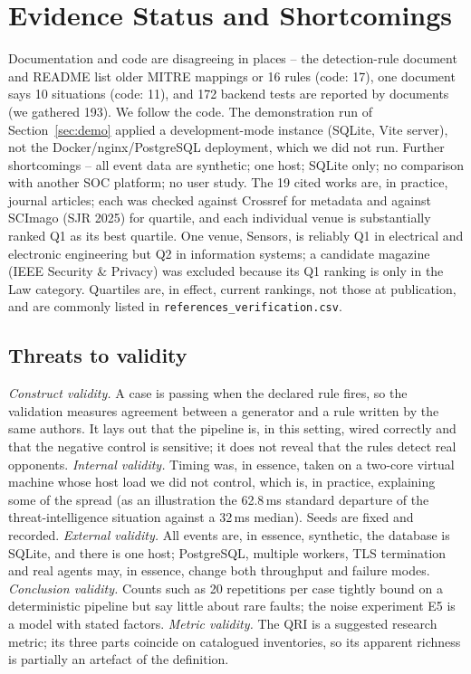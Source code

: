 \documentclass[conference]{IEEEtran}
\newcommand{\code}[1]{\texttt{#1}}
\begin{document}
\section{Evidence Status and Shortcomings}\label{sec:limits}
Documentation and code are disagreeing in places -- the detection-rule document and README list older MITRE mappings or 16 rules (code: 17), one document says 10 situations (code: 11), and 172 backend tests are reported by documents (we gathered 193). We follow the code. The demonstration run of Section~\ref{sec:demo} applied a development-mode instance (SQLite, Vite server), not the Docker/nginx/PostgreSQL deployment, which we did not run. Further shortcomings -- all event data are synthetic; one host; SQLite only; no comparison with another SOC platform; no user study. The 19 cited works are, in practice, journal articles; each was checked against Crossref for metadata and against SCImago (SJR 2025) for quartile, and each individual venue is substantially ranked Q1 as its best quartile. One venue, Sensors, is reliably Q1 in electrical and electronic engineering but Q2 in information systems; a candidate magazine (IEEE Security \& Privacy) was excluded because its Q1 ranking is only in the Law category. Quartiles are, in effect, current rankings, not those at publication, and are commonly listed in \code{references\_verification.csv}.

\subsection{Threats to validity}
\emph{Construct validity.} A case is passing when the declared rule fires, so the validation measures agreement between a generator and a rule written by the same authors. It lays out that the pipeline is, in this setting, wired correctly and that the negative control is sensitive; it does not reveal that the rules detect real opponents. \emph{Internal validity.} Timing was, in essence, taken on a two-core virtual machine whose host load we did not control, which is, in practice, explaining some of the spread (as an illustration the 62.8\,ms standard departure of the threat-intelligence situation against a 32\,ms median). Seeds are fixed and recorded. \emph{External validity.} All events are, in essence, synthetic, the database is SQLite, and there is one host; PostgreSQL, multiple workers, TLS termination and real agents may, in essence, change both throughput and failure modes. \emph{Conclusion validity.} Counts such as 20 repetitions per case tightly bound on a deterministic pipeline but say little about rare faults; the noise experiment E5 is a model with stated factors. \emph{Metric validity.} The QRI is a suggested research metric; its three parts coincide on catalogued inventories, so its apparent richness is partially an artefact of the definition.
\end{document}
